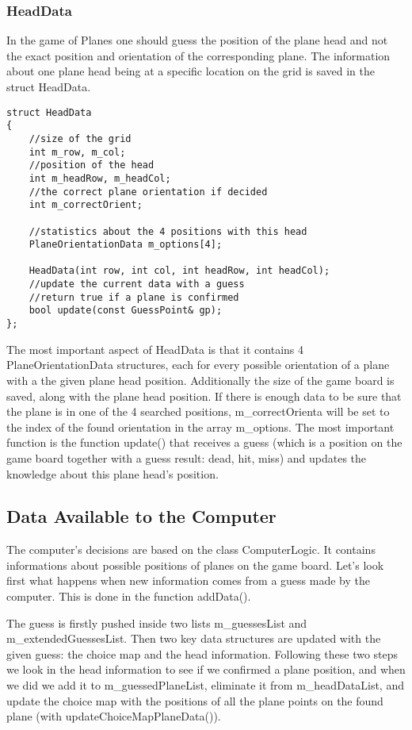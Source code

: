 \subsubsection{HeadData}

In the game of Planes one should guess the position of the plane head and not the exact position and orientation of the corresponding plane. The information about one plane head being at a specific location on the grid is saved in the struct HeadData.

\begin{lstlisting}
struct HeadData
{
	//size of the grid
	int m_row, m_col;
	//position of the head
	int m_headRow, m_headCol;
	//the correct plane orientation if decided
	int m_correctOrient;
	
	//statistics about the 4 positions with this head
	PlaneOrientationData m_options[4];
	
	HeadData(int row, int col, int headRow, int headCol);
	//update the current data with a guess
	//return true if a plane is confirmed
	bool update(const GuessPoint& gp);
};
\end{lstlisting}

The most important aspect of HeadData is that it contains 4 PlaneOrientationData structures, each for every possible orientation of a plane with a the given plane head position. Additionally the size of the game board is saved, along with the plane head position. If there is enough data to be sure that the plane is in one of the 4 searched positions, m\_correctOrienta will be set to the index of the found orientation in the array m\_options. The most important function is the function update() that receives a guess (which is a position on the game board together with a guess result: dead, hit, miss) and updates the knowledge about this plane head's position.

\subsection{Data Available to the Computer}

The computer's decisions are based on the class ComputerLogic. It contains informations about possible positions of planes on the game board. Let's look first what happens when new information comes from a guess made by the computer. This is done in the function addData().

The guess is firstly pushed inside two lists m\_guessesList and m\_extendedGuessesList. Then two key data structures are updated with the given guess: the choice map and the head information. Following these two steps we look in the head information to see if we confirmed a plane position, and when we did we add it to m\_guessedPlaneList, eliminate it from m\_headDataList, and update the choice map with the positions of all the plane points on the found plane (with updateChoiceMapPlaneData()).

